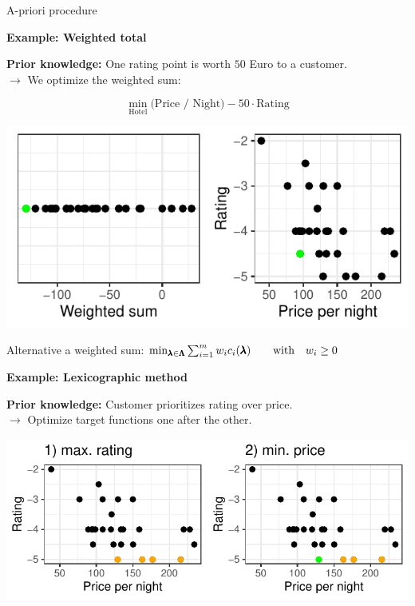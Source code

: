 \begin{frame}[allowframebreaks]{A-priori procedure}

\textbf{Example: Weighted total}


\textbf{Prior knowledge:} One rating point is worth $50$ Euro to a customer. \\
    $\to$ We optimize the weighted sum:

$$
\min_\text{Hotel} \text{(Price / Night)} - 50 \cdot \text{Rating}
$$

    \begin{center}
\includegraphics[scale=0.555555]{images/expedia-9-1}
    \end{center}

Alternative a weighted sum: $\min_{\pmb{\lambda} \in \pmb{\Lambda}} \sum_{i = 1}^m w_i c_i(\pmb{\lambda}) \qquad \text{with} \quad w_i \ge 0 $

\framebreak

\textbf{Example: Lexicographic method}

\textbf{Prior knowledge:} Customer prioritizes rating over price. \\
$\to$ Optimize target functions one after the other.


    \begin{center}
\includegraphics[scale=1]{images/expedia-10-1}
    \end{center}


\end{frame}
